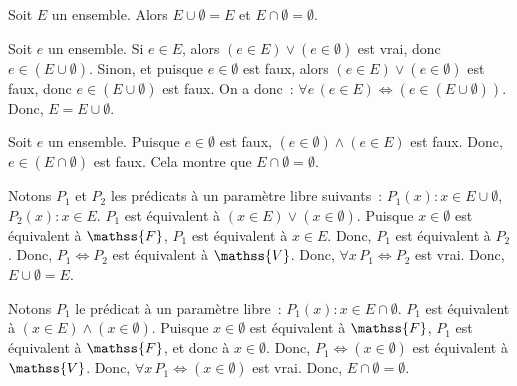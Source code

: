 \blank[medium]

\noindent{} Soit $E$ un ensemble. 
    Alors $E \cup \emptyset = E$ et $E \cap \emptyset = \emptyset$.

\blank[medium]

\noindent{} 
    Soit $e$ un ensemble. 
    Si $e \in E$, alors $(e \in E) \vee (e \in \emptyset)$  est vrai, donc $e \in (E \cup \emptyset)$.
    Sinon, et puisque $e \in \emptyset$ est faux, alors $(e \in E) \vee (e \in \emptyset)$  est faux, donc $e \in (E \cup \emptyset)$ est faux.
    On a donc : $\forall e \, (e \in E) \Leftrightarrow (e \in (E \cup \emptyset))$.
    Donc, $E = E \cup \emptyset$.

    Soit $e$ un ensemble. 
    Puisque $e \in \emptyset$ est faux, $(e \in \emptyset) \wedge (e \in E)$ est faux. 
    Donc, $e \in (E \cap \emptyset)$ est faux.
    Cela montre que $E \cap \emptyset = \emptyset$.

    \done

\blank[medium]

\noindent{} 
    \startitemize[nowhite]
        \item Notons $P_1$ et $P_2$ les prédicats à un paramètre libre suivants : $P_1(x): x \in E \cup \emptyset$, $P_2(x): x \in E$. 
            $P_1$ est équivalent à $(x \in E) \vee (x \in \emptyset)$.
            Puisque $x \in \emptyset$ est équivalent à $\mathss{F}$, $P_1$ est équivalent à $x \in E$.
            Donc, $P_1$ est équivalent à $P_2$.
            Donc, $P_1 \Leftrightarrow P_2$ est équivalent à $\mathss{V}$.
            Donc, $\forall x \, P_1 \Leftrightarrow P_2$ est vrai.
            Donc, $E \cup \emptyset = E$.
        \item Notons $P_1$ le prédicat à un paramètre libre : $P_1(x): x \in E \cap \emptyset$. 
            $P_1$ est équivalent à $(x \in E) \wedge (x \in \emptyset)$.
            Puisque $x \in \emptyset$ est équivalent à $\mathss{F}$, $P_1$ est équivalent à $\mathss{F}$, et donc à $x \in \emptyset$.
            Donc, $P_1 \Leftrightarrow (x \in \emptyset)$ est équivalent à $\mathss{V}$.
            Donc, $\forall x \, P_1 \Leftrightarrow (x \in \emptyset)$ est vrai.
            Donc, $E \cap \emptyset = \emptyset$.
    \stopitemize

    \done

\blank[medium]

